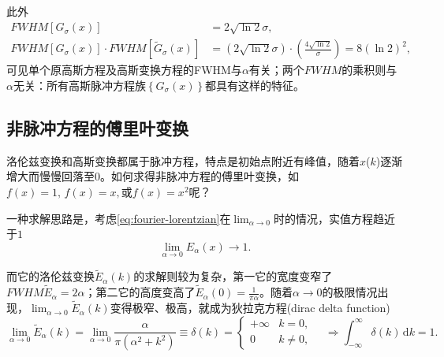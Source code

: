 此外
\begin{equation}
    \label{eq:fourier-gaussian-fwhm-product}
  \begin{split}
    FWHM \left[ G_{\sigma} \left( x \right) \right]
    & = 2 \sqrt{ \ln 2} \sigma, \\
    FWHM \left[ G_{\sigma} \left( x \right) \right] \cdot FWHM \left[ \widetilde{G}_{\sigma} \left( x \right) \right]
    & = \left( 2 \sqrt{\ln 2} \sigma \right) \cdot
    \left( \frac{4 \sqrt{\ln 2}}{\sigma}\right) = 8 \left( \ln 2\right)^{2},
  \end{split}
\end{equation}
可见单个原高斯方程及高斯变换方程的FWHM与$\alpha$有关；两个$FWHM$的乘积则与$\alpha$无关：所有高斯脉冲方程族$\left\{ G_{\sigma}(x) \right\}$都具有这样的特征。

\subsection{非脉冲方程的傅里叶变换}
\label{sec:fourier-non-pulse-functions}
洛伦兹变换和高斯变换都属于脉冲方程，特点是初始点附近有峰值，随着$x$($k$)逐渐增大而慢慢回落至$0$。如何求得非脉冲方程的傅里叶变换，如$f(x) = 1, \, f(x)=x, $或$f(x) = x^{2}$呢？

一种求解思路是，考虑\eqref{eq:fourier-lorentzian}在$\lim_{\alpha \rightarrow 0}$时的情况，实值方程趋近于$1$
\begin{equation*}
  \lim_{\alpha \rightarrow 0} E_{\alpha}(x) \rightarrow 1.
\end{equation*}

而它的洛伦兹变换$\widetilde{E}_{\alpha}(k)$的求解则较为复杂，第一它的宽度变窄了$FWHM \widetilde{E}_{\alpha} = 2 \alpha$；第二它的高度变高了$\widetilde{E}_{\alpha} \left( 0 \right) = \frac{1}{\pi \alpha}$。随着$\alpha \rightarrow 0$的极限情况出现，$\lim_{\alpha \rightarrow 0} \widetilde{E}_{\alpha}(k)$变得极窄、极高，就成为狄拉克方程(dirac delta function) 
\begin{equation}
  \label{eq:fourier-non-pulse-dirac}
  \lim_{\alpha \rightarrow 0} \widetilde{E}_{\alpha}(k) = \lim_{\alpha \rightarrow 0} \frac{
  \alpha
  }{\pi \left( \alpha^{2} + k^{2} \right)}
  \equiv \delta (k) = \begin{cases}
  + \infty & k = 0, \\
  0 & k \neq 0,
\end{cases} \quad \Rightarrow \int_{- \infty}^{\infty} \delta (k) \, \mathrm{d} k = 1.
\end{equation}

